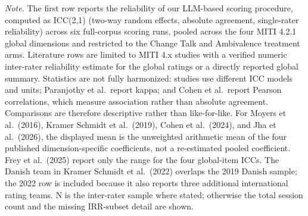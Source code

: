 \begin{minipage}{\linewidth}
\footnotesize\textit{Note.} The first row reports the reliability of our LLM-based scoring procedure, computed as ICC(2,1) (two-way random effects, absolute agreement, single-rater reliability) across six full-corpus scoring runs, pooled across the four MITI 4.2.1 global dimensions and restricted to the Change Talk and Ambivalence treatment arms. Literature rows are limited to MITI 4.x studies with a verified numeric inter-rater reliability estimate for the global ratings or a directly reported global summary. Statistics are not fully harmonized: studies use different ICC models and units; Paranjothy et al.\ report kappa; and Cohen et al.\ report Pearson correlations, which measure association rather than absolute agreement. Comparisons are therefore descriptive rather than like-for-like. For Moyers et al.\ (2016), Kramer Schmidt et al.\ (2019), Cohen et al.\ (2024), and Jha et al.\ (2026), the displayed mean is the unweighted arithmetic mean of the four published dimension-specific coefficients, not a re-estimated pooled coefficient. Frey et al.\ (2025) report only the range for the four global-item ICCs. The Danish team in Kramer Schmidt et al.\ (2022) overlaps the 2019 Danish sample; the 2022 row is included because it also reports three additional international rating teams. N is the inter-rater sample where stated; otherwise the total session count and the missing IRR-subset detail are shown.
\end{minipage}